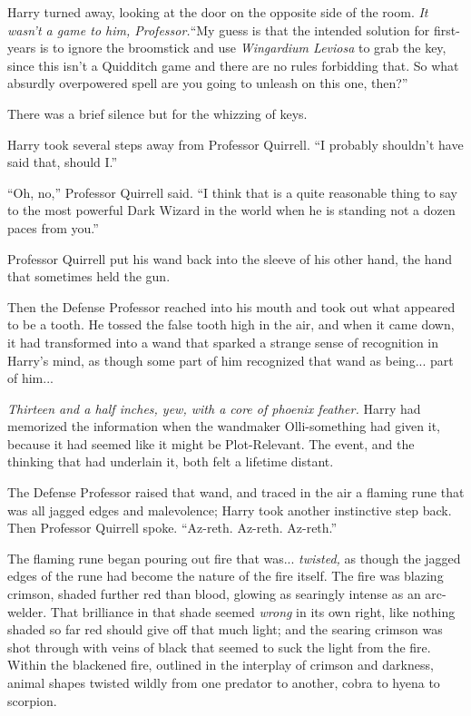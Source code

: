 Harry turned away, looking at the door on the opposite side of the room. \emph{It wasn't a game to him, Professor.}``My guess is that the intended solution for first-years is to ignore the broomstick and use \emph{Wingardium Leviosa} to grab the key, since this isn't a Quidditch game and there are no rules forbidding that. So what absurdly overpowered spell are you going to unleash on this one, then?''

There was a brief silence but for the whizzing of keys.

Harry took several steps away from Professor Quirrell. ``I probably shouldn't have said that, should I.''

``Oh, no,'' Professor Quirrell said. ``I think that is a quite reasonable thing to say to the most powerful Dark Wizard in the world when he is standing not a dozen paces from you.''

Professor Quirrell put his wand back into the sleeve of his other hand, the hand that sometimes held the gun.

Then the Defense Professor reached into his mouth and took out what appeared to be a tooth. He tossed the false tooth high in the air, and when it came down, it had transformed into a wand that sparked a strange sense of recognition in Harry's mind, as though some part of him recognized that wand as being... part of him...

\emph{Thirteen and a half inches, yew, with a core of phoenix feather.} Harry had memorized the information when the wandmaker Olli-something had given it, because it had seemed like it might be Plot-Relevant. The event, and the thinking that had underlain it, both felt a lifetime distant.

The Defense Professor raised that wand, and traced in the air a flaming rune that was all jagged edges and malevolence; Harry took another instinctive step back. Then Professor Quirrell spoke. ``Az-reth. Az-reth. Az-reth.''

The flaming rune began pouring out fire that was... \emph{twisted,} as though the jagged edges of the rune had become the nature of the fire itself. The fire was blazing crimson, shaded further red than blood, glowing as searingly intense as an arc-welder. That brilliance in that shade seemed \emph{wrong} in its own right, like nothing shaded so far red should give off that much light; and the searing crimson was shot through with veins of black that seemed to suck the light from the fire. Within the blackened fire, outlined in the interplay of crimson and darkness, animal shapes twisted wildly from one predator to another, cobra to hyena to scorpion.

